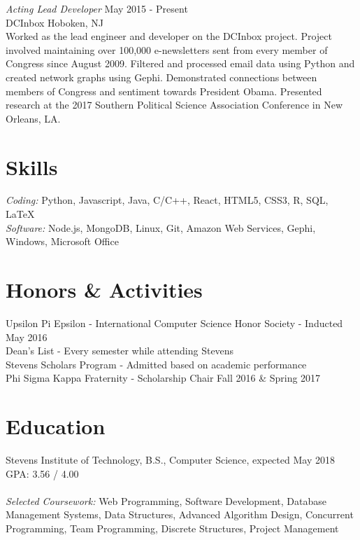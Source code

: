 \documentclass{res}
\begin{document}
{{\sl Acting Lead Developer} \hfill May 2015 - Present \\
DCInbox \hfill Hoboken, NJ \\
Worked as the lead engineer and developer on the DCInbox project. Project involved maintaining over 100,000 e-newsletters sent from every member of Congress since August 2009. Filtered and processed email data using Python and created network graphs using Gephi. Demonstrated connections between members of Congress and sentiment towards President Obama. Presented research at the 2017 Southern Political Science Association Conference in New Orleans, LA.


\section{\bf\large Skills}
{\sl Coding: } Python, Javascript, Java, C/C++, React, HTML5, CSS3, R, SQL, LaTeX \\
{\sl Software:} Node.js, MongoDB, Linux, Git, Amazon Web Services, Gephi, Windows, Microsoft Office

\section{\bf\large Honors \& Activities}
Upsilon Pi Epsilon - International Computer Science Honor Society - Inducted May 2016\\
Dean's List - Every semester while attending Stevens \\
Stevens Scholars Program - Admitted based on academic performance \\ %
Phi Sigma Kappa Fraternity - Scholarship Chair Fall 2016 \& Spring 2017

\section{\bf\large Education}
Stevens Institute of Technology, B.S., Computer Science, expected May 2018 \hfill GPA: 3.56 / 4.00 \\ \\
{\sl Selected Coursework:} Web Programming, Software Development, Database Management Systems, Data Structures, Advanced Algorithm Design, Concurrent Programming, Team Programming, Discrete Structures, Project Management

}
\end{document}
